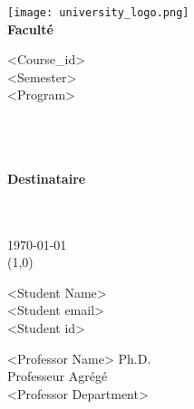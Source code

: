 
 \begingroup
 \fontsize{11pt}{12pt}\selectfont

 \setlength\parindent{0pt}
 \thispagestyle{empty}
 \vspace{12mm}
 \noindent\begin{minipage}{0.3\textwidth}
 \texttt{[image: university\_logo.png]}\\
 \textbf{Faculté}
 \end{minipage}%
 \hfill%
 \begin{minipage}{0.6\textwidth}\raggedleft
<Course_id> \\
 <Semester> \\
 <Program>
 \end{minipage}
 \begin{center}
 	\vspace{110pt}
 	{\Large {}}\\\vspace{30pt}
 	{\Large {}} \\
 	\vspace{10pt}
 	{\Large \text{}} \\
 	\vspace{130pt}
     {\Large \textbf{Destinataire}} \\
     \vspace{20pt}
     {\Large {}} \\
     \\
     \vspace{110pt}
 \end{center}
 \today
 \vspace{20pt}
 \\
 \line(1,0){\textwidth}\\
 \noindent\begin{minipage}{0.3\textwidth}\raggedright
 <Student Name>\\
 <Student email>\\
 <Student id>\\
 \end{minipage}%
 \hfill%
 \begin{minipage}{0.6\textwidth}\raggedleft
 <Professor Name> Ph.D.\\
 Professeur Agrégé \\
 <Professor Department>
 \end{minipage}

 \endgroup